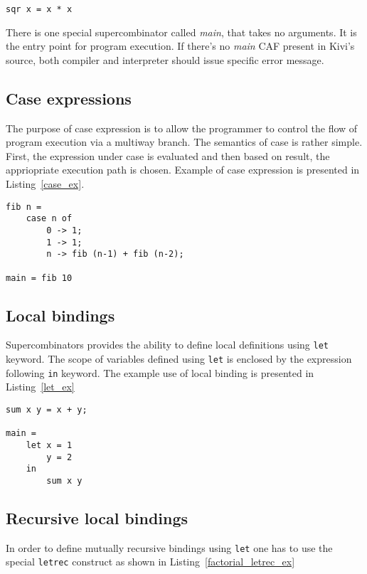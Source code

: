 \documentclass[a4paper]{report}
\begin{document}
\begin{lstlisting}[label=supercombinator_ex,caption={Simple supercombinator.}]
sqr x = x * x
\end{lstlisting}

There is one special supercombinator called \textit{main}, that takes no
arguments. It is the entry point for program execution. If there's no
\textit{main} CAF present in Kivi's source, both compiler and interpreter
should issue specific error message.

\subsection{Case expressions}
The purpose of case expression is to allow the programmer to control the flow
of program execution via a multiway branch. The semantics of case is rather
simple. First, the expression under case is evaluated and then based on result,
the appriopriate execution path is chosen. Example of case expression is
presented in Listing~\ref{case_ex}.

\begin{lstlisting}[label=case_ex,caption={Fibonacci with case}]
fib n =
    case n of
        0 -> 1;
        1 -> 1;
        n -> fib (n-1) + fib (n-2);

main = fib 10
\end{lstlisting}

\subsection{Local bindings}
Supercombinators provides the ability to define local definitions using
\texttt{let} keyword. The scope of variables defined using \texttt{let} is
enclosed by the expression following \texttt{in} keyword. The example use of
local binding is presented in Listing~\ref{let_ex}


\begin{lstlisting}[label=let_ex,caption={Local \texttt{let} binding.}]
sum x y = x + y;

main =
    let x = 1
        y = 2
    in
        sum x y
\end{lstlisting}

\subsection{Recursive local bindings}
In order to define mutually recursive bindings using \texttt{let} one has to use the
special \texttt{letrec} construct as shown in Listing~\ref{factorial_letrec_ex}
\end{document}

